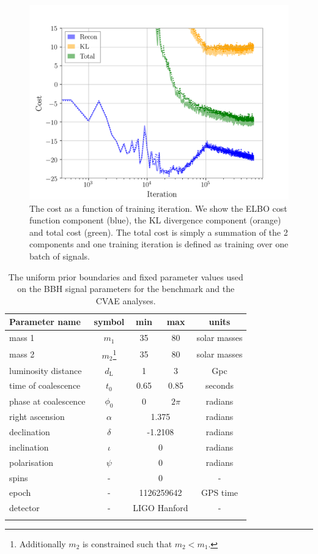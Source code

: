 \documentclass[%
showpacs,
 amsmath,amssymb,
 aps,
 twocolumn,
 prl,
 reprint,
floatfix,
]{revtex4-1}
\begin{document}
%
%
\begin{figure}
    \includegraphics[width=\columnwidth]{inv_losses_log.png}
\caption{\label{fig:loss_log} The cost as a function of training iteration. We
show the \ac{ELBO} cost function component (blue), the \ac{KL} divergence
component (orange) and total cost (green). The total cost is simply a
summation of the 2 components and one training iteration is defined as
training over one batch of signals.}
\end{figure}

%
%
\begin{table}
\centering
\caption{The uniform prior boundaries and fixed parameter values used on the \ac{BBH} signal parameters for the benchmark
and the \ac{CVAE} analyses.}
\begin{tabular}[t]{lcccc}
\toprule
Parameter name & symbol & min & max & units \\
\hline
mass 1 & $m_1$ & 35 & 80 & solar masses \\
mass 2 & $m_2$\footnote{Additionally $m_2$ is constrained such that
$m_{2}<m_{1}$.} & 35 & 80 & solar masses \\
luminosity distance & $d_{\text{L}}$ & 1 & 3 & Gpc \\
time of coalescence & $t_{0}$ & 0.65 & 0.85 & seconds \\
phase at coalescence & $\phi_{0}$ & 0 & $2\pi$ & radians \\
\hline
right ascension & $\alpha$ & \multicolumn{2}{c}{1.375} & radians \\
declination & $\delta$ & \multicolumn{2}{c}{-1.2108} & radians \\
inclination & $\iota$ & \multicolumn{2}{c}{0} & radians \\
polarisation & $\psi$ & \multicolumn{2}{c}{0} & radians \\
spins & - & \multicolumn{2}{c}{0} & - \\
epoch & - & \multicolumn{2}{c}{1126259642} & GPS time \\
detector & - & \multicolumn{2}{c}{LIGO Hanford} & - \\
\botrule
\end{tabular}
\label{tab:prior_ranges}
\end{table}
\end{document}
